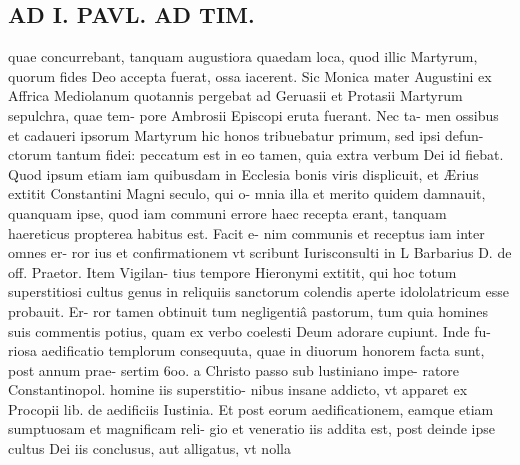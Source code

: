 \documentclass{article}
\begin{document}
\begin{pages}
\section*{AD I. PAVL. AD TIM. }
\marginpar{[ p.70 ]}\pstart quae concurrebant, tanquam augustiora quaedam loca, quod illic Martyrum, quorum fides Deo accepta fuerat, ossa iacerent. Sic Monica mater Augustini ex Affrica Mediolanum quotannis pergebat ad Geruasii et Protasii Martyrum sepulchra, quae tem- pore Ambrosii Episcopi eruta fuerant. Nec ta- men ossibus et cadaueri ipsorum Martyrum hic honos tribuebatur primum, sed ipsi defun- ctorum tantum fidei: peccatum est in eo tamen, quia extra verbum Dei id fiebat. Quod ipsum etiam iam quibusdam in Ecclesia bonis viris displicuit, et Ærius extitit Constantini Magni seculo, qui o- mnia illa et merito quidem damnauit, quanquam ipse, quod iam communi errore haec recepta erant, tanquam haereticus propterea habitus est. Facit e- nim communis et receptus iam inter omnes er- ror ius et confirmationem vt scribunt Iurisconsulti in L Barbarius D. de off. Praetor. Item Vigilan- tius tempore Hieronymi extitit, qui hoc totum superstitiosi cultus genus in reliquiis sanctorum colendis aperte idololatricum esse probauit. Er- ror tamen obtinuit tum negligentiâ pastorum, tum quia homines suis commentis potius, quam ex verbo coelesti Deum adorare cupiunt. Inde fu- riosa aedificatio templorum consequuta, quae in diuorum honorem facta sunt, post annum prae- sertim 6oo. a Christo passo sub lustiniano impe- ratore Constantinopol. homine iis superstitio- nibus insane addicto, vt apparet ex Procopii lib.  de aedificiis Iustinia. Et post eorum aedificationem, eamque etiam sumptuosam et magnificam reli- gio et veneratio iis addita est, post deinde ipse cultus Dei iis conclusus, aut alligatus, vt nolla  \pend

\end{pages}
\end{document}
